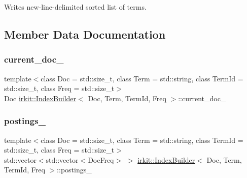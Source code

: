 Writes new-\/line-\/delimited sorted list of terms. 



\subsection{Member Data Documentation}
\mbox{\label{classirkit_1_1IndexBuilder_a52d46fb2bd04b9e5ee0e9fdcf98e2f7b}} 
\subsubsection{\texorpdfstring{current\+\_\+doc\+\_\+}{current\_doc\_}}
{\footnotesize\ttfamily template$<$class Doc  = std\+::size\+\_\+t, class Term  = std\+::string, class Term\+Id  = std\+::size\+\_\+t, class Freq  = std\+::size\+\_\+t$>$ \\
Doc \hyperlink{classirkit_1_1IndexBuilder}{irkit\+::\+Index\+Builder}$<$ Doc, Term, Term\+Id, Freq $>$\+::current\+\_\+doc\+\_\+\hspace{0.3cm}{\ttfamily [protected]}}

\mbox{\label{classirkit_1_1IndexBuilder_a4dcd133d2afe183e6f5bb379592391c4}} 
\subsubsection{\texorpdfstring{postings\+\_\+}{postings\_}}
{\footnotesize\ttfamily template$<$class Doc  = std\+::size\+\_\+t, class Term  = std\+::string, class Term\+Id  = std\+::size\+\_\+t, class Freq  = std\+::size\+\_\+t$>$ \\
std\+::vector$<$std\+::vector$<$Doc\+Freq$>$ $>$ \hyperlink{classirkit_1_1IndexBuilder}{irkit\+::\+Index\+Builder}$<$ Doc, Term, Term\+Id, Freq $>$\+::postings\+\_\+\hspace{0.3cm}{\ttfamily [protected]}}

\mbox{\label{classirkit_1_1IndexBuilder_a7a6b13e964f05c659fe17cf61a9738e9}} 
